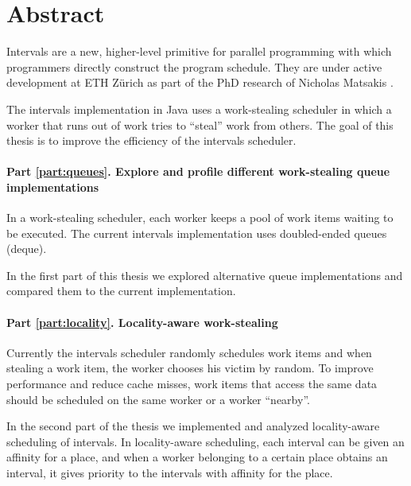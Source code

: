 
\chapter*{Abstract}
\label{chap:abstract}

Intervals are a new, higher-level primitive for parallel programming
with which programmers directly construct the program schedule. They
are under active development at ETH Zürich as part of the PhD research
of Nicholas Matsakis \cite{Matsakis2010}.

The intervals implementation in Java uses a work-stealing scheduler in
which a worker that runs out of work tries to ``steal'' work from
others. The goal of this thesis is to improve the efficiency of the
intervals scheduler.

\subsubsection*{Part \ref{part:queues}. Explore and profile different
  work-stealing queue implementations}

In a work-stealing scheduler, each worker keeps a pool of work items
waiting to be executed. The current intervals implementation uses
doubled-ended queues (deque).  

In the first part of this thesis we explored alternative queue
implementations and compared them to the current implementation.

\subsubsection*{Part \ref{part:locality}. Locality-aware
  work-stealing}

Currently the intervals scheduler randomly schedules work items and
when stealing a work item, the worker chooses his victim by random. To
improve performance and reduce cache misses, work items that access
the same data should be scheduled on the same worker or a worker
``nearby''.

In the second part of the thesis we implemented and analyzed
locality-aware scheduling of intervals. In locality-aware scheduling,
each interval can be given an affinity for a place, and when a worker
belonging to a certain place obtains an interval, it gives priority to
the intervals with affinity for the place.

